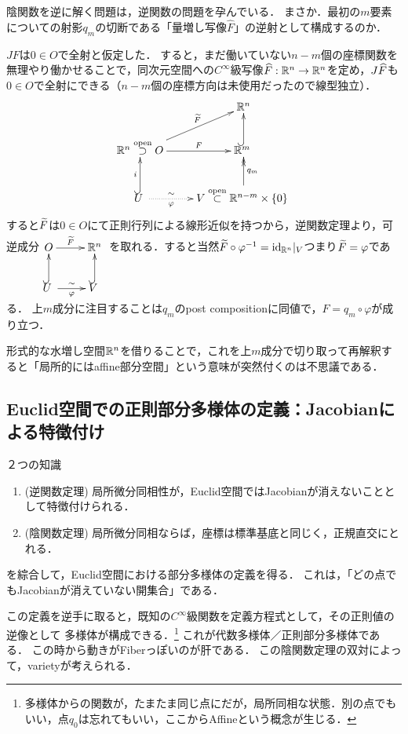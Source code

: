 \documentclass[uplatex,dvipdfmx]{jsreport}
\begin{document}
\begin{remarks}
    陰関数を逆に解く問題は，逆関数の問題を孕んでいる．
    まさか．最初の$m$要素についての射影$q_m$の切断である「量増し写像$\widehat{F}$」の逆射として構成するのか．

    $JF$は$0\in O$で全射と仮定した．
    すると，まだ働いていない$n-m$個の座標関数を無理やり働かせることで，同次元空間への$C^\infty$級写像$\widehat{F}:\mathbb{R}^n\to\mathbb{R}^n$を定め，$J\widehat{F}$も$0\in O$で全射にできる（$n-m$個の座標方向は未使用だったので線型独立）．
    \[\xymatrix{
        &\R^n\\
        \R^n\osup O\ar[r]^-F\ar[ur]^-{\wt{F}}&\R^m \;\ar@{^{(}->}[u]\\
        U \;\ar@{^{(}->}[u]^-i\ar@{.>}[r]_-{\varphi}^-\sim&V\osub\R^{n-m}\times\{0\} \;\ar@{->>}[u]_-{q_m}
    }\]
    すると$\widetilde{F}$は$0\in O$にて正則行列による線形近似を持つから，逆関数定理より，可逆成分$\xymatrix{
        O\ar[r]^-{\wt{F}}&\R^n\\
        U\ar[r]^-\sim_-{\varphi} \;\ar@{^{(}->}[u]&V \;\ar@{^{(}->}[u]
    }$
    を取れる．すると当然$\widetilde{F}\circ\varphi^{-1}=\mathrm{id}_{\mathbb{R}^n}|_V$つまり$\widetilde{F}=\varphi$である．
    上$m$成分に注目することは$q_m$のpost compositionに同値で，$F=q_m\circ\varphi$が成り立つ．

    形式的な水増し空間$\R^n$を借りることで，これを上$m$成分で切り取って再解釈すると「局所的にはaffine部分空間」という意味が突然付くのは不思議である．
\end{remarks}

\subsection{Euclid空間での正則部分多様体の定義：Jacobianによる特徴付け}

\begin{tcolorbox}[colframe=ForestGreen, colback=ForestGreen!10!white,breakable,colbacktitle=ForestGreen!40!white,coltitle=black,fonttitle=\bfseries\sffamily,
title=数の空間$\R^n$では，多様体の構成に鮮やかな代数的手法がある．]
    ２つの知識
    \begin{enumerate}
        \item (逆関数定理) 局所微分同相性が，Euclid空間ではJacobianが消えないこととして特徴付けられる．
        \item (陰関数定理) 局所微分同相ならば，座標は標準基底と同じく，正規直交にとれる．
    \end{enumerate}
    を綜合して，Euclid空間における部分多様体の定義を得る．
    これは，「どの点でもJacobianが消えていない開集合」である．

    この定義を逆手に取ると，既知の$C^\infty$級関数を定義方程式として，その正則値の逆像として
    多様体が構成できる．\footnote{多様体からの関数が，たまたま同じ点にだが，局所同相な状態．別の点でもいい，点$q_0$は忘れてもいい，ここからAffineという概念が生じる．}
    これが代数多様体／正則部分多様体である．
    この時から動きがFiberっぽいのが肝である．
    この陰関数定理の双対によって，varietyが考えられる．
\end{tcolorbox}
\end{document}
